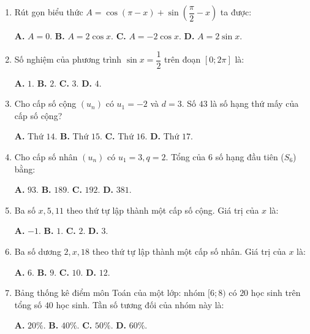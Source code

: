 \documentclass[12pt, a4paper]{article}
\begin{document}
\begin{enumerate}[leftmargin=1.5em]
    \item Rút gọn biểu thức $A = \cos(\pi - x) + \sin\left(\dfrac{\pi}{2} - x\right)$ ta được:
    \begin{center}
    \textbf{A.} $A = 0$. \qquad \textbf{B.} $A = 2\cos x$. \qquad \textbf{C.} $A = -2\cos x$. \qquad \textbf{D.} $A = 2\sin x$.
    \end{center}

    \item Số nghiệm của phương trình $\sin x = \dfrac{1}{2}$ trên đoạn $[0; 2\pi]$ là:
    \begin{center}
    \textbf{A.} $1$. \qquad \textbf{B.} $2$. \qquad \textbf{C.} $3$. \qquad \textbf{D.} $4$.
    \end{center}

    \item Cho cấp số cộng $(u_n)$ có $u_1 = -2$ và $d = 3$. Số $43$ là số hạng thứ mấy của cấp số cộng?
    \begin{center}
    \textbf{A.} Thứ $14$. \qquad \textbf{B.} Thứ $15$. \qquad \textbf{C.} Thứ $16$. \qquad \textbf{D.} Thứ $17$.
    \end{center}

    \item Cho cấp số nhân $(u_n)$ có $u_1 = 3, q = 2$. Tổng của $6$ số hạng đầu tiên ($S_6$) bằng:
    \begin{center}
    \textbf{A.} $93$. \qquad \textbf{B.} $189$. \qquad \textbf{C.} $192$. \qquad \textbf{D.} $381$.
    \end{center}

    \item Ba số $x, 5, 11$ theo thứ tự lập thành một cấp số cộng. Giá trị của $x$ là:
    \begin{center}
    \textbf{A.} $-1$. \qquad \textbf{B.} $1$. \qquad \textbf{C.} $2$. \qquad \textbf{D.} $3$.
    \end{center}

    \item Ba số dương $2, x, 18$ theo thứ tự lập thành một cấp số nhân. Giá trị của $x$ là:
    \begin{center}
    \textbf{A.} $6$. \qquad \textbf{B.} $9$. \qquad \textbf{C.} $10$. \qquad \textbf{D.} $12$.
    \end{center}

    \item Bảng thống kê điểm môn Toán của một lớp: nhóm $[6; 8)$ có $20$ học sinh trên tổng số $40$ học sinh. Tần số tương đối của nhóm này là:
    \begin{center}
    \textbf{A.} $20\%$. \qquad \textbf{B.} $40\%$. \qquad \textbf{C.} $50\%$. \qquad \textbf{D.} $60\%$.
    \end{center}


\end{enumerate}
\end{document}
